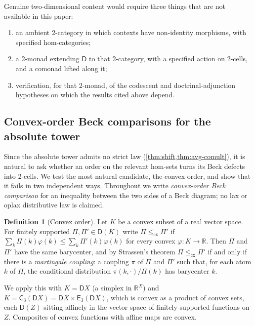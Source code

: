 \documentclass[11pt]{article}
\theoremstyle{definition}
\newtheorem{definition}[theorem]{Definition}
\theoremstyle{remark}
\newcommand{\D}{\mathsf{D}}
\newcommand{\C}{\mathsf{C}}
\newcommand{\E}{\mathsf{E}}
\begin{document}
Genuine two-dimensional content would require three things that are not available in this paper:
\begin{enumerate}[label=(\roman*)]
\item an ambient 2-category in which contexts have non-identity morphisms, with specified
  hom-categories;
\item a 2-monad extending $\D$ to that 2-category, with a specified action on 2-cells, and a
  comonad lifted along it;
\item verification, for that 2-monad, of the codescent and doctrinal-adjunction hypotheses on which
  the results cited above depend.
\end{enumerate}

\subsection{Convex-order Beck comparisons for the absolute tower}\label{sec:cx}

Since the absolute tower admits no strict law (\cref{thm:shift,thm:avg-comult}), it is natural to ask
whether an order on the relevant hom-sets turns its Beck defects into 2-cells. We test the most
natural candidate, the convex order, and show that it fails in two independent ways. Throughout we
write \emph{convex-order Beck comparison} for an inequality between the two sides of a Beck diagram;
no lax or oplax distributive law is claimed.

\begin{definition}[Convex order]
Let $K$ be a convex subset of a real vector space. For finitely supported $\Pi,\Pi'\in\D(K)$ write
$\Pi\le_{\mathrm{cx}}\Pi'$ if $\sum_k\Pi(k)\varphi(k)\le\sum_k\Pi'(k)\varphi(k)$ for every convex
$\varphi\colon K\to\mathbb{R}$. Then $\Pi$ and $\Pi'$ have the same barycenter, and by Strassen's
theorem \cite{Strassen1965} $\Pi\le_{\mathrm{cx}}\Pi'$ if and only if there is a \emph{martingale
coupling}: a coupling $\pi$ of $\Pi$ and $\Pi'$ such that, for each atom $k$ of $\Pi$, the
conditional distribution $\pi(k,\cdot)/\Pi(k)$ has barycenter $k$.
\end{definition}

We apply this with $K=\D X$ (a simplex in $\mathbb{R}^X$) and $K=\C_3(\D X)=\D X\times\E_3(\D X)$, which
is convex as a product of convex sets, each $\D(Z)$ sitting affinely in the vector space of finitely
supported functions on $Z$. Composites of convex functions with affine maps are convex.
\end{document}
